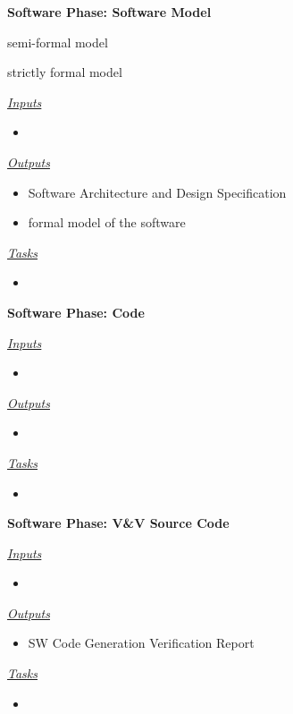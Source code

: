 \documentclass{template/openetcs_article}
\begin{document}
\begin{description}
\item \textbf{Software Phase: Software Model}
\begin{description}
\item semi-formal model 
\item strictly formal model
\end{description}
\underline{\textit{Inputs}}
\begin{itemize}
\item 
\end{itemize}

\underline{\textit{Outputs}}
\begin{itemize}
\item Software Architecture and Design Specification
\item formal model of the software
\end{itemize}

\underline{\textit{Tasks}}
\begin{itemize}
\item 
\end{itemize}
\end{description}

\begin{description}
\item \textbf{Software Phase: Code}

\underline{\textit{Inputs}}
\begin{itemize}
\item 
\end{itemize}

\underline{\textit{Outputs}}
\begin{itemize}
\item 
\end{itemize}

\underline{\textit{Tasks}}
\begin{itemize}
\item 
\end{itemize}
\end{description}

\begin{description}
\item \textbf{Software Phase: V\&V Source Code}

\underline{\textit{Inputs}}
\begin{itemize}
\item 
\end{itemize}

\underline{\textit{Outputs}}
\begin{itemize}
\item SW Code Generation Verification Report
\end{itemize}

\underline{\textit{Tasks}}
\begin{itemize}
\item 
\end{itemize}
\end{description}
\end{document}
